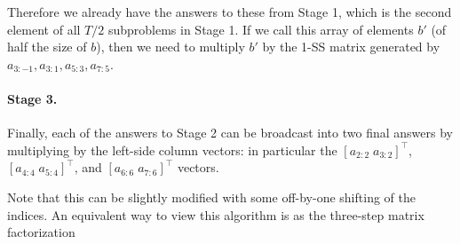 \documentclass{article}
\begin{document}
Therefore we already have the answers to these from Stage 1,
which is the second element of all $T/2$ subproblems in Stage 1.
If we call this array of elements $b'$ (of half the size of $b$),
then we need to multiply $b'$ by the 1-SS matrix generated by $a_{3:-1}, a_{3:1}, a_{5:3}, a_{7:5}$.

\paragraph{Stage 3.}
Finally, each of the answers to Stage 2 can be broadcast into two final answers by multiplying by the left-side column vectors:
in particular the $[ a_{2:2} \; a_{3:2} ]^{\top}$, $[ a_{4:4} \; a_{5:4} ]^{\top}$, and $[ a_{6:6} \; a_{7:6} ]^{\top}$ vectors.

Note that this can be slightly modified with some off-by-one shifting of the indices.
An equivalent way to view this algorithm is as the three-step matrix factorization
\end{document}
